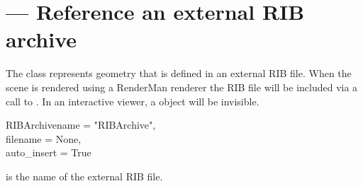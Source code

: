 
\section{ ---
         Reference an external RIB archive}

The  class represents geometry that is defined in
an external RIB file. When the scene is rendered using a RenderMan
renderer the RIB file will be included via a call to 
. In an interactive viewer, a 
object will be invisible.

\begin{classdesc}{RIBArchive}{name = "RIBArchive",\\ 
                              filename = None, \\
                              auto_insert = True}

 is the name of the external RIB file.

\end{classdesc}


